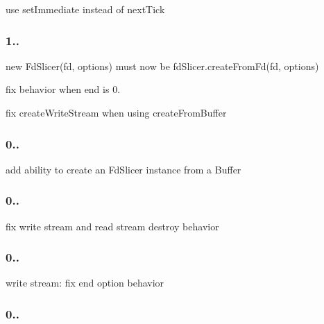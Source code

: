 
\begin{DoxyItemize}
\item use {\ttfamily set\+Immediate} instead of {\ttfamily next\+Tick}
\end{DoxyItemize}

\subsubsection*{1..}


\begin{DoxyItemize}
\item {\ttfamily new Fd\+Slicer(fd, options)} must now be {\ttfamily fd\+Slicer.\+create\+From\+Fd(fd, options)}
\item fix behavior when {\ttfamily end} is 0.
\item fix {\ttfamily create\+Write\+Stream} when using {\ttfamily create\+From\+Buffer}
\end{DoxyItemize}

\subsubsection*{0..}


\begin{DoxyItemize}
\item add ability to create an Fd\+Slicer instance from a Buffer
\end{DoxyItemize}

\subsubsection*{0..}


\begin{DoxyItemize}
\item fix write stream and read stream destroy behavior
\end{DoxyItemize}

\subsubsection*{0..}


\begin{DoxyItemize}
\item write stream\+: fix end option behavior
\end{DoxyItemize}

\subsubsection*{0..}


